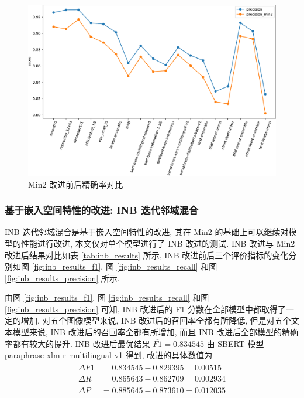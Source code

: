 \documentclass[12pt]{article}
\begin{document}
\begin{figure}[htbp]
  \centering
  \includegraphics[width=14cm]{min2_results_precision_df.pdf}
  \caption{Min2 改进前后精确率对比}
  \label{fig:min2_results_precision}
\end{figure}

\subsubsection{基于嵌入空间特性的改进: INB 迭代邻域混合}

INB 迭代邻域混合是基于嵌入空间特性的改进, 其在 Min2 的基础上可以继续对模型的性能进行改进, 本文仅对单个模型进行了 INB 改进的测试. INB 改进与 Min2 改进后结果对比如表 \ref{tab:inb_results} 所示, INB 改进前后三个评价指标的变化分别如图 \ref{fig:inb_results_f1}, 图 \ref{fig:inb_results_recall} 和图 \ref{fig:inb_results_precision} 所示.

由图 \ref{fig:inb_results_f1}, 图 \ref{fig:inb_results_recall} 和图 \ref{fig:inb_results_precision} 可知, INB 改进后的 F1 分数在全部模型中都取得了一定的增加, 对五个图像模型来说, INB 改进后的召回率全都有所降低, 但是对五个文本模型来说, INB 改进后的召回率全都有所增加, 而且 INB 改进后全部模型的精确率都有较大的提升. INB 改进后最优结果 $\overline{F1}=0.834545$ 由 SBERT 模型 paraphrase-xlm-r-multilingual-v1 得到, 改进的具体数值为
\begin{equation}
  \begin{aligned}
    \Delta\overline{F1}&=0.834545-0.829395=0.00515\\
    \Delta\bar{R}&=0.865643-0.862709=0.002934\\
    \Delta\bar{P}&=0.885645-0.873610=0.012035\\
  \end{aligned}
\end{equation}
\end{document}
